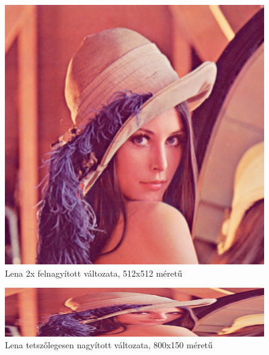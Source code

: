 \begin{figure}[!ht]
	\centering
	\includegraphics[width=150mm, keepaspectratio]{figures/lena_scaled.png}
	\caption{Lena 2x felnagyított változata, 512x512 méretű} 
\end{figure}

\begin{figure}[!ht]
	\centering
	\includegraphics[width=150mm, keepaspectratio]{figures/lena_scaled_2.png}
	\caption{Lena tetszőlegesen nagyított változata, 800x150 méretű} 
\end{figure}
